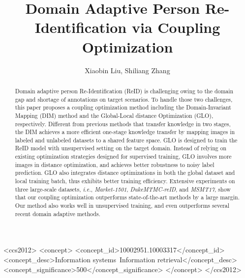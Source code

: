 \documentclass[sigconf]{acmart}
\begin{document}
\fancyhead{}

\title{Domain Adaptive Person Re-Identification via Coupling Optimization}

\author{Xiaobin Liu, Shiliang Zhang}

\begin{abstract}
  Domain adaptive person Re-Identification (ReID) is challenging owing to the domain gap and shortage of annotations on target scenarios. To handle those two challenges, this paper proposes a coupling optimization method including the Domain-Invariant Mapping (DIM) method and the Global-Local distance Optimization (GLO), respectively. Different from previous methods that transfer knowledge in two stages, the DIM achieves a more efficient one-stage knowledge transfer by mapping images in labeled and unlabeled datasets to a shared feature space. GLO is designed to train the ReID model with unsupervised setting on the target domain. Instead of relying on existing optimization strategies designed for supervised training, GLO involves more images in distance optimization, and achieves better robustness to noisy label prediction. GLO also integrates distance optimizations in both the global dataset and local training batch, thus exhibits better training efficiency. Extensive experiments on three large-scale datasets, \textit{i.e.}, \textit{Market-1501}, \textit{DukeMTMC-reID}, and \textit{MSMT17}, show that our coupling optimization outperforms state-of-the-art methods by a large margin. Our method also works well in unsupervised training, and even outperforms several recent domain adaptive methods.

\end{abstract}

\begin{CCSXML}
<ccs2012>
<concept>
<concept_id>10002951.10003317</concept_id>
<concept_desc>Information systems~Information retrieval</concept_desc>
<concept_significance>500</concept_significance>
</concept>
</ccs2012>
\end{CCSXML}





\maketitle
\end{document}
